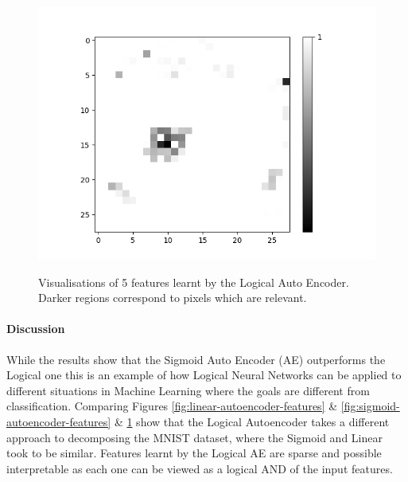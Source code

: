 \begin{figure}[H]
\begin{minipage}[b]{0.19\textwidth}
		\includegraphics[width=\textwidth]{LoAE(AND)(20LF)/False/Feature-17.png}
		\label{}
	\end{minipage}
	\caption{Visualisations of 5 features learnt by the Logical Auto Encoder. Darker regions correspond to pixels which are relevant.}
	\label{fig:logical-autoencoder-features}
	\hfill
\end{figure}

\paragraph{Discussion}
While the results show that the Sigmoid Auto Encoder (AE) outperforms the Logical one this is an example of how Logical Neural Networks can be applied to different situations in Machine Learning where the goals are different from classification. Comparing Figures \ref{fig:linear-autoencoder-features} \& \ref{fig:sigmoid-autoencoder-features} \& \ref{fig:logical-autoencoder-features} show that the Logical Autoencoder takes a different approach to decomposing the MNIST dataset, where the Sigmoid and Linear took to be similar. Features learnt by the Logical AE are sparse and possible interpretable as each one can be viewed as a logical AND of the input features.
